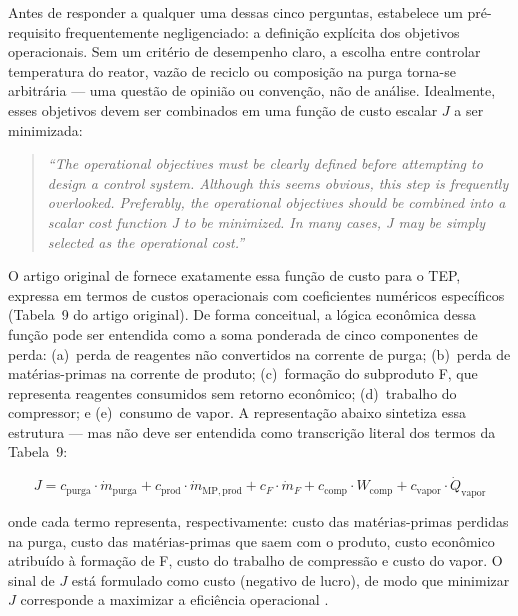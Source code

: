 Antes de responder a qualquer uma dessas cinco perguntas,  estabelece um
pré-requisito frequentemente negligenciado: a definição explícita dos objetivos operacionais. Sem um
critério de desempenho claro, a escolha entre controlar temperatura do reator, vazão de reciclo ou
composição na purga torna-se arbitrária — uma questão de opinião ou convenção, não de análise.
Idealmente, esses objetivos devem ser combinados em uma função de custo escalar $J$ a ser minimizada:

\begin{quote}
	\textit{``The operational objectives must be clearly defined before attempting to design a control
		system. Although this seems obvious, this step is frequently overlooked. Preferably, the operational
		objectives should be combined into a scalar cost function J to be minimized. In many cases, J may be
		simply selected as the operational cost.''} \cite{Skogestad2004}
\end{quote}

O artigo original de  fornece exatamente essa função de custo para o TEP,
expressa em termos de custos operacionais com coeficientes numéricos específicos (Tabela~9 do artigo
original). De forma conceitual, a lógica econômica dessa função pode ser entendida como a soma
ponderada de cinco componentes de perda: (a)~perda de reagentes não convertidos na corrente de
purga; (b)~perda de matérias-primas na corrente de produto; (c)~formação do subproduto F, que
representa reagentes consumidos sem retorno econômico; (d)~trabalho do compressor; e (e)~consumo de
vapor. A representação abaixo sintetiza essa estrutura — mas não deve ser entendida como transcrição
literal dos termos da Tabela~9:

\begin{equation}
	J = c_{\mathrm{purga}} \cdot \dot{m}_{\mathrm{purga}}
	+ c_{\mathrm{prod}} \cdot \dot{m}_{\mathrm{MP,prod}}
	+ c_F \cdot \dot{m}_F
	+ c_{\mathrm{comp}} \cdot W_{\mathrm{comp}}
	+ c_{\mathrm{vapor}} \cdot \dot{Q}_{\mathrm{vapor}}
	\label{eq:tep_cost}
\end{equation}

\noindent onde cada termo representa, respectivamente: custo das matérias-primas perdidas na purga,
custo das matérias-primas que saem com o produto, custo econômico atribuído à formação de F, custo
do trabalho de compressão e custo do vapor. O sinal de $J$ está formulado como custo (negativo de
lucro), de modo que minimizar $J$ corresponde a maximizar a eficiência operacional \cite{DOWNS1993}.


